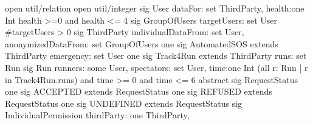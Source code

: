 \documentclass[a4paper]{article}
\begin{document}
{\selectfont
open util/relation 
\newline open util/integer
\newline 
\newline sig User {
\newline dataFor: set ThirdParty,
\newline health:one Int
\newline } { health >=0 and health <= 4}
\newline 
\newline sig GroupOfUsers {
\newline targetUsers: set User
\newline }{#targetUsers > 0}
\newline 
\newline sig ThirdParty {
\newline individualDataFrom: set User,
\newline anonymizedDataFrom: set GroupOfUsers
\newline }
\newline 
\newline one sig AutomatedSOS extends ThirdParty {
\newline 	emergency: set User
\newline }
\newline 
\newline one sig Track4Run extends ThirdParty {
\newline runs: set Run 
\newline }
\newline 
\newline sig Run{
\newline runners: some User,
\newline spectators: set User,
\newline time:one Int
\newline }{(all r: Run | r in Track4Run.runs) and time >= 0 and time <= 6 }
\newline 
\newline 
\newline abstract sig RequestStatus {}
\newline one sig ACCEPTED extends RequestStatus {}
\newline one sig REFUSED extends RequestStatus {}
\newline one sig UNDEFINED extends RequestStatus{}
\newline 
\newline sig IndividualPermission {
\newline thirdParty: one ThirdParty,
}}
\end{document}
